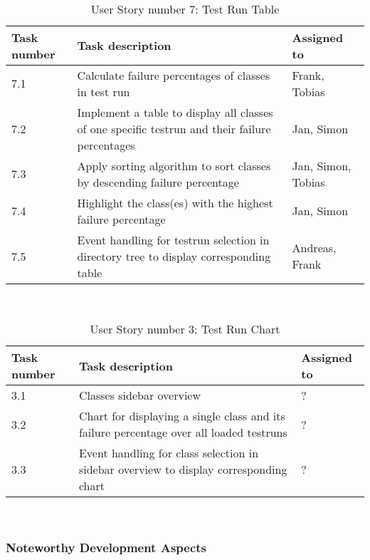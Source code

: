 \ \\ 

\begin{table}[h]
  \caption{User Story number 7: Test Run Table}
  \label{US_Table}
  \centering
  \begin{tabular}{p{1.5cm}|p{9cm}|p{3cm}|}
  	Task number & Task description & Assigned to \\ 
  	\hline
  	\hline
  	7.1 & Calculate failure percentages of classes in test run & Frank, Tobias \\ 
  	\hline
  	7.2 & Implement a table to display all classes of one specific testrun and their failure percentages & Jan, Simon \\ 
  	\hline
  	7.3 & Apply sorting algorithm to sort classes by descending failure percentage & Jan, Simon, Tobias \\
  	\hline
  	7.4 & Highlight the class(es) with the highest failure percentage & Jan, Simon \\
  	\hline
  	7.5 & Event handling for testrun selection in directory tree to display corresponding table & Andreas, Frank \\ 
  	\hline
  \end{tabular}
\end{table} 

\ \\ 

\begin{table}[h]
  \caption{User Story number 3: Test Run Chart}
  \label{US_Chart}
  \centering
  \begin{tabular}{p{1.5cm}|p{9cm}|p{3cm}|}
  	Task number & Task description & Assigned to \\ 
  	\hline
  	\hline
  	3.1 & Classes sidebar overview & ? \\ 
  	\hline
  	3.2 & Chart for displaying a single class and its failure percentage over all loaded testruns & ? \\ 
  	\hline
  	3.3 & Event handling for class selection in sidebar overview to display corresponding chart & ? \\
  	\hline
  \end{tabular}
\end{table} 

\ \\ 

\subsubsection*{Noteworthy Development Aspects}

